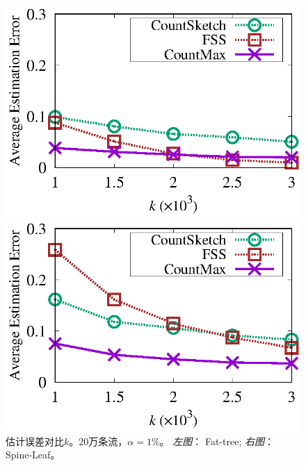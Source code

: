 \begin{figure}[!t]
	\centering
	\begin{minipage}[t]{0.49\linewidth}
		\centering
		\includegraphics[width=\linewidth]{fig/ft_k_appr_200000_099.eps}
	\end{minipage}\vspace{-0.6em}%
	\begin{minipage}[t]{0.49\linewidth}
		\centering
		\includegraphics[width=\linewidth]{fig/hy_k_appr_200000_099.eps}
	\end{minipage}\vspace{-0.6em}%
	\caption{\textnormal{估计误差对比$k$。20万条流，$\alpha = 1\%$。 \textit{左图}： Fat-tree; \textit{右图}： Spine-Leaf。}}
	\label{fig:acc,k,20,1}
\end{figure}

